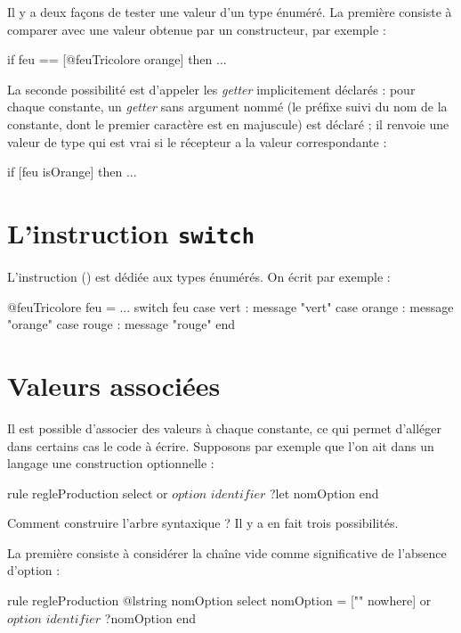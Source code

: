 
Il y a deux façons de tester une valeur d'un type énuméré. La première consiste à comparer avec une valeur obtenue par un constructeur, par exemple :
\begin{galgascode}
  if feu == [@feuTricolore orange] then ...
\end{galgascode}

La seconde possibilité est d'appeler les \emph{getter} implicitement déclarés : pour chaque constante, un \emph{getter} sans argument nommé   (le préfixe  suivi du nom de la constante, dont le premier caractère est en majuscule) est déclaré ; il renvoie une valeur de type  qui est vrai si le récepteur a la valeur correspondante :
\begin{galgascode}
  if [feu isOrange] then ...
\end{galgascode}

\section{L'instruction \texttt{switch}}

L'instruction  () est dédiée aux types énumérés. On écrit par exemple :

\begin{galgascode}
@feuTricolore feu = ...
switch feu
case vert : message "vert"
case orange : message "orange"
case rouge : message "rouge" 
end
\end{galgascode}


\section{Valeurs associées}

Il est possible d'associer des valeurs à chaque constante, ce qui permet d'alléger dans certains cas le code à écrire. Supposons par exemple que l'on ait dans un langage une construction optionnelle :

\begin{galgascode}
rule regleProduction {
  select
  or
    $option$
    $identifier$ ?let nomOption
  end
}
\end{galgascode}

Comment construire l'arbre syntaxique ? Il y a en fait trois possibilités.

La première consiste à considérer la chaîne vide comme significative de l'absence d'option :
\begin{galgascode}
rule regleProduction {
  @lstring nomOption
  select
    nomOption = ["" nowhere]
  or
    $option$
    $identifier$ ?nomOption
  end
}
\end{galgascode}

